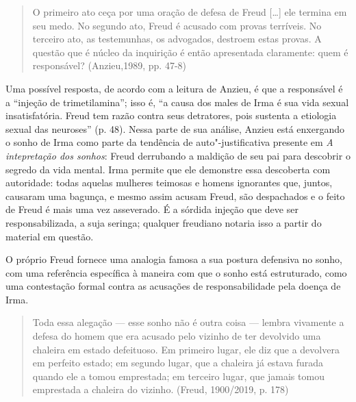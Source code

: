 \begin{quote}
O primeiro ato ceça por uma oração de defesa de Freud {[}\ldots{}{]} ele
termina em seu medo. No segundo ato, Freud é acusado com provas
terríveis. No terceiro ato, as testemunhas, os advogados, destroem estas
provas. A questão que é núcleo da inquirição é então apresentada
claramente: quem é responsável? (Anzieu,1989, pp. 47-8)
\end{quote}

Uma possível resposta, de acordo com a leitura de Anzieu, é que a
responsável é a ``injeção de trimetilamina''; isso é, ``a causa dos
males de Irma é sua vida sexual insatisfatória. Freud tem razão contra
seus detratores, pois sustenta a etiologia sexual das neuroses'' (p.
48). Nessa parte de sua análise, Anzieu está enxergando o sonho de Irma
como parte da tendência de auto"-justificativa presente em \emph{A
intepretação dos sonhos}: Freud derrubando a maldição de seu pai para
descobrir o segredo da vida mental. Irma permite que ele demonstre essa
descoberta com autoridade: todas aquelas mulheres teimosas e homens
ignorantes que, juntos, causaram uma bagunça, e mesmo assim acusam
Freud, são despachados e o feito de Freud é mais uma vez asseverado. É a
sórdida injeção que deve ser responsabilizada, a suja seringa; qualquer
freudiano notaria isso a partir do material em questão.

O próprio Freud fornece uma analogia famosa a sua postura defensiva no
sonho, com uma referência específica à maneira com que o sonho está
estruturado, como uma contestação formal contra as acusações de
responsabilidade pela doença de Irma.

\begin{quote}
Toda essa alegação --- esse sonho não é outra coisa --- lembra vivamente a
defesa do homem que era acusado pelo vizinho de ter devolvido uma
chaleira em estado defeituoso. Em primeiro lugar, ele diz que a
devolvera em perfeito estado; em segundo lugar, que a chaleira já estava
furada quando ele a tomou emprestada; em terceiro lugar, que jamais
tomou emprestada a chaleira do vizinho. (Freud, 1900/2019, p. 178)
\end{quote}

